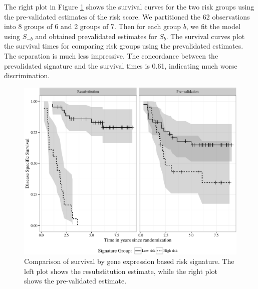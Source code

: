 \documentclass[12pt,]{article}
\begin{document}
The right plot in Figure \ref{fig2} shows the survival curves for the
two risk groups using the pre-validated estimates of the risk score. We
partitioned the 62 observations into 8 groups of 6 and 2 groups of 7.
Then for each group \(b\), we fit the model using \(S_{-b}\) and
obtained prevalidated estimates for \(S_{b}\). The survival curves plot
the survival times for comparing risk groups using the prevalidated
estimates. The separation is much less impressive. The concordance
between the prevalidated signature and the survival times is 0.61,
indicating much worse discrimination.

\begin{figure}[htbp]
\centering
\includegraphics{paper_files/figure-latex/examppresub-1.pdf}
\caption{Comparison of survival by gene expression based risk signature.
The left plot shows the resubstitution estimate, while the right plot
shows the pre-validated estimate. \label{fig2}}
\end{figure}
\end{document}
